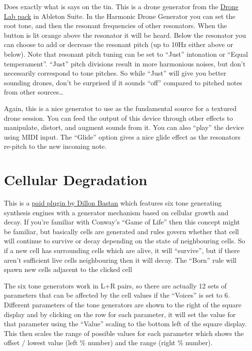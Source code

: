\documentclass[
  12pt,
  letterpaper,
  oneside,
  open=any]{scrbook}
\makeatletter
\newcommand*\pandocbounded[1]{%
  \sbox\pandoc@box{#1}%
  \Gscale@div\@tempa{\textheight}{\dimexpr\ht\pandoc@box+\dp\pandoc@box\relax}%
  \Gscale@div\@tempb{\linewidth}{\wd\pandoc@box}%
  \ifdim\@tempb\p@<\@tempa\p@\let\@tempa\@tempb\fi%
  \ifdim\@tempa\p@<\p@\scalebox{\@tempa}{\usebox\pandoc@box}%
  \else\usebox{\pandoc@box}%
  \fi%
}
\makeatother
\begin{document}
Does exactly what is says on the tin. This is a drone generator from the
\href{https://www.ableton.com/en/packs/drone-lab/\#?}{Drone Lab pack} in
Ableton Suite. In the Harmonic Drone Generator you can set the root
tone, and then the resonant frequencies of other resonators. When the
button is lit orange above the resonator it will be heard. Below the
resonator you can choose to add or decrease the resonant pitch (up to
10Hz either above or below). Note that resonant pitch tuning can be set
to ``Just'' intonation or ``Equal temperament''. ``Just'' pitch
divisions result in more harmonious noises, but don't necessarily
correspond to tone pitches. So while ``Just'' will give you better
sounding drones, don't be surprised if it sounds ``off'' compared to
pitched notes from other sources\ldots{}

Again, this is a nice generator to use as the fundamental source for a
textured drone session. You can feed the output of this device through
other effects to manipulate, distort, and augment sounds from it. You
can also ``play'' the device using MIDI input. The ``Glide'' option
gives a nice glide effect as the resonators re-pitch to the new incoming
note.

\pandocbounded{\texttt{[image: images/Harmonic\_Drone\_Generator.png]}}

\section{Cellular Degradation}\label{cellular-degradation}

This is a
\href{https://dillonbastan.gumroad.com/l/yyehc?layout=profile}{paid
plugin by Dillon Bastan} which features six tone generating synthesis
engines with a generator mechanism based on cellular growth and decay.
If you're familiar with Conway's ``Game of Life'' then this concept
might be familiar, but basically cells are generated and rules govern
whether that cell will continue to survive or decay depending on the
state of neighbouring cells. So if a new cell has surrounding cells
which are alive, it will ``survive'', but if there aren't sufficient
live cells neighbouring then it will decay. The ``Born'' rule will spawn
new cells adjacent to the clicked cell

The six tone generators work in L+R pairs, so there are actually 12 sets
of parameters that can be affected by the cell values if the ``Voices''
is set to 6. Different parameters of the tone generators are shown to
the right of the square display and by clicking on the row for each
parameter, it will set the value for that parameter using the ``Value''
scaling to the bottom left of the square display. This then scales the
range of possible values for each parameter which shows the offset /
lowest value (left \% number) and the range (right \% number).
\end{document}
